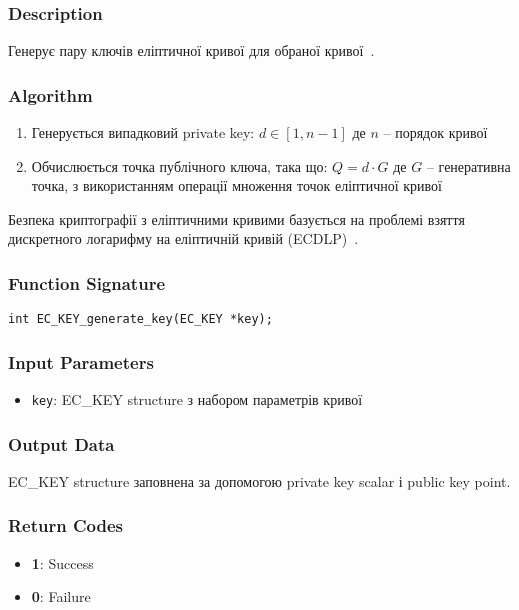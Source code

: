 \subsubsection{Description}
Генерує пару ключів еліптичної кривої для обраної кривої~\cite{hankerson2006guide, koblitz1987elliptic}.

\subsubsection{Algorithm}
\begin{enumerate}
    \item Генерується випадковий private key: $d \in [1, n-1]$ де $n$ -- порядок кривої
    \item Обчислюється точка публічного ключа, така що: $Q = d \cdot G$ де $G$ -- генеративна точка, з використанням 
    операції множення точок еліптичної кривої
\end{enumerate}

Безпека криптографії з еліптичними кривими базується на проблемі взяття дискретного логарифму на еліптичній кривій (ECDLP)~\cite{miller1986use}.

\subsubsection{Function Signature}
\begin{verbatim}
int EC_KEY_generate_key(EC_KEY *key);
\end{verbatim}

\subsubsection{Input Parameters}
\begin{itemize}
    \item \texttt{key}: EC\_KEY structure з набором параметрів кривої
\end{itemize}

\subsubsection{Output Data}
EC\_KEY structure заповнена за допомогою private key scalar і public key point.

\subsubsection{Return Codes}
\begin{itemize}
    \item \textbf{1}: Success
    \item \textbf{0}: Failure
\end{itemize}

